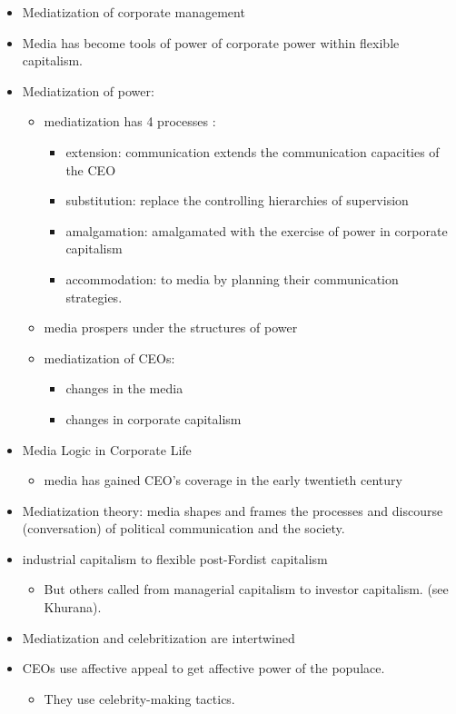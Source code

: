 \documentclass[
]{book}
\providecommand{\tightlist}{%
  \setlength{\itemsep}{0pt}\setlength{\parskip}{0pt}}
\begin{document}
\begin{itemize}
\item
  Mediatization of corporate management
\item
  Media has become tools of power of corporate power within flexible
  capitalism.
\item
  Mediatization of power:

  \begin{itemize}
  \item
    mediatization has 4 processes \citep{Schulz_2004}:

    \begin{itemize}
    \item
      extension: communication extends the communication
      capacities of the CEO
    \item
      substitution: replace the controlling hierarchies of
      supervision
    \item
      amalgamation: amalgamated with the exercise of power in
      corporate capitalism
    \item
      accommodation: to media by planning their communication
      strategies.
    \end{itemize}
  \item
    media prospers under the structures of power
  \item
    mediatization of CEOs:

    \begin{itemize}
    \item
      changes in the media
    \item
      changes in corporate capitalism
    \end{itemize}
  \end{itemize}
\item
  Media Logic in Corporate Life

  \begin{itemize}
  \tightlist
  \item
    media has gained CEO's coverage in the early twentieth century
    \citep[pp.~31]{Kantola_2014}
  \end{itemize}
\item
  Mediatization theory: media shapes and frames the processes and
  discourse (conversation) of political communication and the society.
\item
  industrial capitalism to flexible post-Fordist capitalism

  \begin{itemize}
  \tightlist
  \item
    But others called from managerial capitalism to investor
    capitalism. (see Khurana).
  \end{itemize}
\item
  Mediatization and celebritization are intertwined
\item
  CEOs use affective appeal to get affective power of the populace.

  \begin{itemize}
  \tightlist
  \item
    They use celebrity-making tactics.
  \end{itemize}
\end{itemize}
\end{document}
